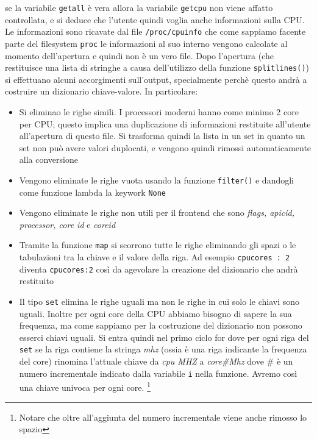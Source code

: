 \documentclass[11pt]{article}
\begin{document}
se la variabile \texttt{getall} è vera allora la variabile \texttt{getcpu} non viene affatto controllata, e si deduce
che l'utente quindi voglia anche informazioni sulla CPU.\\
Le informazioni sono ricavate dal file \texttt{/proc/cpuinfo} che come sappiamo facente parte del filesystem \texttt{proc}
le informazioni al suo interno vengono calcolate al momento dell'apertura e quindi non è un vero file. 
Dopo l'apertura (che restituisce una lista di stringhe a causa dell'utilizzo della funzione \texttt{splitlines()})
si effettuano alcuni accorgimenti sull'output, specialmente perchè questo andrà a costruire un dizionario chiave-valore.
In particolare:
\begin{itemize}
	\item{Si eliminao le righe simili. I processori moderni hanno come minimo 2 core per CPU; questo implica una
		duplicazione di informazioni restituite all'utente all'apertura di questo file. Si trasforma quindi
		la lista in un set in quanto un set non può avere valori duplocati, e vengono quindi rimossi automaticamente
		alla conversione}
	\item{Vengono eliminate le righe vuota usando la funzione \texttt{filter()} e dandogli come funzione lambda
		la keywork \texttt{None}}
	\item{Vengono eliminate le righe non utili per il frontend che sono \textit{flags, apicid, processor, core id}
		e \textit{coreid}}
	\item{Tramite la funzione \texttt{map} si scorrono tutte le righe eliminando gli spazi o le tabulazioni tra la chiave
		e il valore della riga. Ad esempio \texttt{cpucores	: 2} diventa \texttt{cpucores:2} così
		da agevolare la creazione del dizionario che andrà restituito}
	\item{Il tipo \texttt{set} elimina le righe uguali ma non le righe in cui solo le chiavi sono uguali. Inoltre
		per ogni core della CPU abbiamo bisogno di sapere la sua frequenza, ma come sappiamo per la costruzione
		del dizionario non possono esserci chiavi uguali. Si entra quindi nel primo ciclo for dove  per ogni riga
		del \texttt{set} se la riga contiene la stringa \textit{mhz} (ossia è una riga indicante la frequenza del core)
		rinomina l'attuale chiave da \textit{cpu MHZ} a \textit{core\#Mhz} dove \# è un numero incrementale indicato
		dalla variabile \texttt{i} nella funzione. Avremo così una chiave univoca per ogni core.
		\footnote{\label{nospaceindictkeys}Notare che oltre all'aggiunta del numero incrementale viene anche rimosso
		lo spazio}}
\end{itemize}
\end{document}
